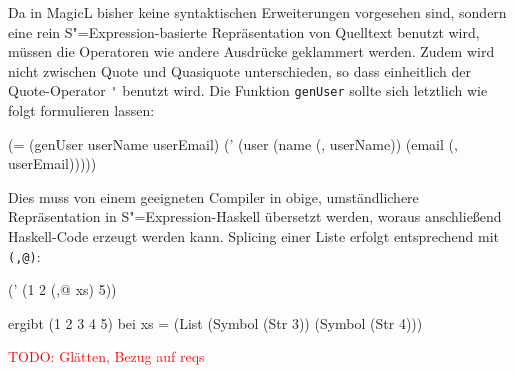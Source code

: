 \documentclass[11pt, a4paper, bibgerm]{scrbook}
\newenvironment{DIFnomarkup}{}{}
\newcommand\icode[1]{\lstinline?#1?}
\newcommand{\todo}[1]{
  \textcolor{red}{TODO: #1}
}
\newcommand{\sexp}{S"=Expression}
\begin{document}
Da in MagicL bisher keine syntaktischen Erweiterungen vorgesehen sind,
sondern eine rein \sexp{}-basierte Repräsentation von Quelltext benutzt
wird, müssen die Operatoren wie andere Ausdrücke geklammert
werden. Zudem wird nicht zwischen Quote und Quasiquote unterschieden, so
dass einheitlich der Quote-Operator \icode{'} benutzt wird. Die Funktion
\icode{genUser} sollte sich letztlich wie folgt formulieren lassen:
\begin{DIFnomarkup}\begin{code}
(= (genUser userName userEmail)
   (' (user (name (, userName)) (email (, userEmail)))))
\end{code}\end{DIFnomarkup}
Dies muss von einem geeigneten Compiler in obige, umständlichere
Repräsentation in \sexp{}-Haskell übersetzt werden, woraus anschließend
Haskell-Code erzeugt werden kann. Splicing einer Liste erfolgt
entsprechend mit \icode{(,@)}:
\begin{DIFnomarkup}\begin{code}
(' (1 2 (,@ xs) 5))

ergibt (1 2 3 4 5) bei xs = (List (Symbol (Str 3))
                                  (Symbol (Str 4)))
\end{code}\end{DIFnomarkup}


\todo{Glätten, Bezug auf reqs}
\end{document}
